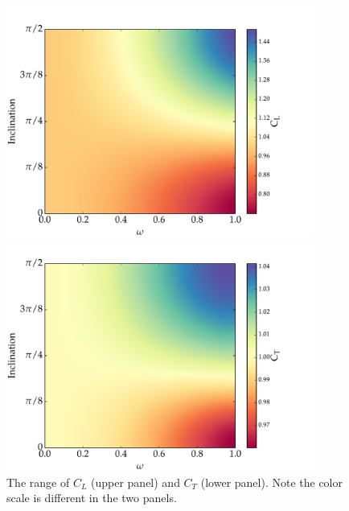 \documentclass[12pt]{article}
\begin{document}
\begin{figure}
  \centering
  \includegraphics[width=0.9\textwidth]{../plots/C_L.pdf}
  
  \includegraphics[width=0.9\textwidth]{../plots/C_T.pdf}
  
  \caption{The range of $C_L$ (upper panel) and $C_T$ (lower panel). Note the
    color scale is different in the two panels. \label{fig:coeff}}
\end{figure}
\end{document}
